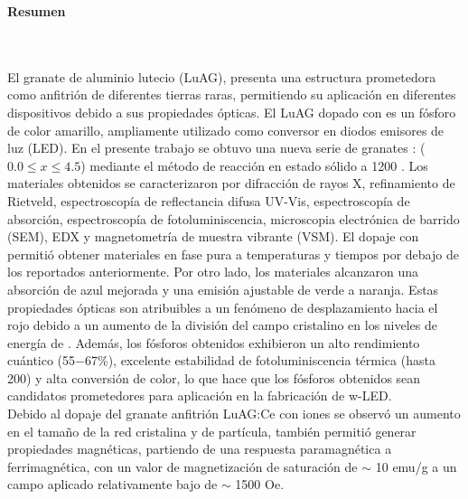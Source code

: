 \newpage
\textbf{\LARGE Resumen}
{}\\\\

El granate de aluminio lutecio (LuAG), presenta una estructura prometedora como
anfitrión de diferentes tierras raras, permitiendo su aplicación en diferentes
dispositivos debido a sus propiedades ópticas. El LuAG dopado con  es
un fósforo de color amarillo, ampliamente utilizado como conversor en diodos emisores
de luz (LED). En el presente trabajo se obtuvo una nueva serie de granates
: ($0.0 \leq x \leq 4.5$)
mediante el método de reacción en estado sólido a 1200 \textcelsius. Los
materiales
obtenidos se caracterizaron por difracción de rayos X, refinamiento de
Rietveld, espectroscopía de reflectancia difusa UV-Vis, espectroscopía de
absorción, espectroscopía de fotoluminiscencia, microscopia electrónica de
barrido (SEM),
EDX y magnetometría de muestra vibrante (VSM). El dopaje con 
permitió
obtener materiales en fase pura a temperaturas y tiempos por debajo de los
reportados anteriormente. Por otro lado, los materiales alcanzaron una
absorción
de azul mejorada y una emisión ajustable de verde a naranja. Estas
propiedades ópticas son atribuibles a un fenómeno de desplazamiento hacia el
rojo debido a un aumento de la división del campo cristalino en los niveles de
energía de . Además, los fósforos obtenidos exhibieron un alto
rendimiento
cuántico (55$-$67\%), excelente estabilidad de fotoluminiscencia térmica (hasta
200\textcelsius) y alta conversión de color, lo que hace que los fósforos
obtenidos
sean candidatos prometedores para aplicación en la fabricación de w-LED.\\

Debido al dopaje del granate anfitrión LuAG:Ce con iones  se
observó un
aumento en el tamaño de la red cristalina y de partícula, también permitió
generar propiedades magnéticas,
partiendo de una respuesta paramagnética a ferrimagnética, con un valor de
magnetización de saturación de $\sim$
10 emu/g a un campo aplicado relativamente bajo de $\sim$ 1500 Oe.


